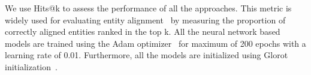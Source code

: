 	We use Hits@k to assess the performance of all the approaches.
	This metric is widely used for evaluating entity alignment~\cite{hao2016joint,chen2016multilingual,sun2017cross,zhu2017iterative} by measuring the proportion of correctly aligned entities ranked in the top k.
	All the neural network based models are trained using the Adam optimizer~\cite{Kingma2014Adam} for maximum of 200 epochs with a learning rate
    of 0.01.
    Furthermore, all the models are initialized using Glorot initialization~\cite{Glorot2010Understanding}.
	
